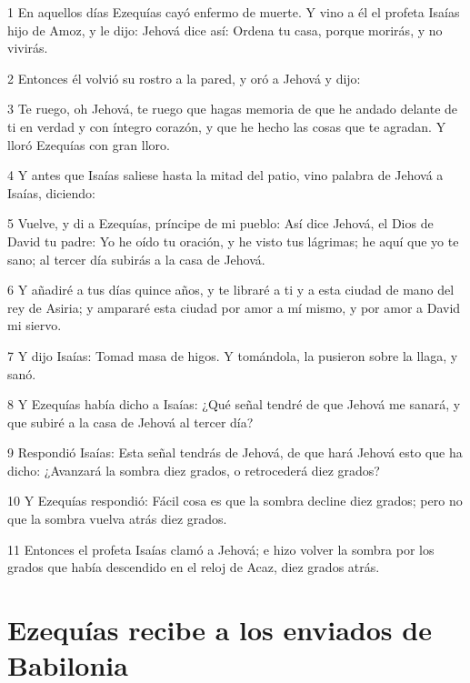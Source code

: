 \par 1 En aquellos días Ezequías cayó enfermo de muerte. Y vino a él el profeta Isaías hijo de Amoz, y le dijo: Jehová dice así: Ordena tu casa, porque morirás, y no vivirás.
\par 2 Entonces él volvió su rostro a la pared, y oró a Jehová y dijo:
\par 3 Te ruego, oh Jehová, te ruego que hagas memoria de que he andado delante de ti en verdad y con íntegro corazón, y que he hecho las cosas que te agradan. Y lloró Ezequías con gran lloro.
\par 4 Y antes que Isaías saliese hasta la mitad del patio, vino palabra de Jehová a Isaías, diciendo:
\par 5 Vuelve, y di a Ezequías, príncipe de mi pueblo: Así dice Jehová, el Dios de David tu padre: Yo he oído tu oración, y he visto tus lágrimas; he aquí que yo te sano; al tercer día subirás a la casa de Jehová. 
\par 6 Y añadiré a tus días quince años, y te libraré a ti y a esta ciudad de mano del rey de Asiria; y ampararé esta ciudad por amor a mí mismo, y por amor a David mi siervo.
\par 7 Y dijo Isaías: Tomad masa de higos. Y tomándola, la pusieron sobre la llaga, y sanó.
\par 8 Y Ezequías había dicho a Isaías: ¿Qué señal tendré de que Jehová me sanará, y que subiré a la casa de Jehová al tercer día?
\par 9 Respondió Isaías: Esta señal tendrás de Jehová, de que hará Jehová esto que ha dicho: ¿Avanzará la sombra diez grados, o retrocederá diez grados?
\par 10 Y Ezequías respondió: Fácil cosa es que la sombra decline diez grados; pero no que la sombra vuelva atrás diez grados.
\par 11 Entonces el profeta Isaías clamó a Jehová; e hizo volver la sombra por los grados que había descendido en el reloj de Acaz, diez grados atrás.

\section*{Ezequías recibe a los enviados de Babilonia}

